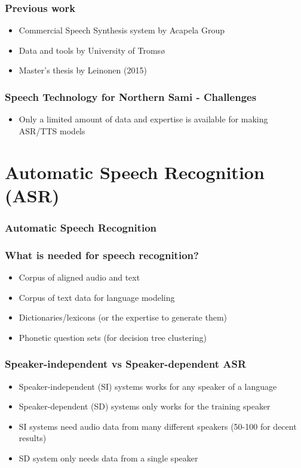 \begin{frame}
\frametitle{Previous work}
\begin{itemize}
\item Commercial Speech Synthesis system by Acapela Group\\
\item Data and tools by University of Tromsø\\[1cm]
\item Master's thesis by Leinonen (2015)\\
\end{itemize}
\end{frame}

\begin{frame}
\frametitle{Speech Technology for Northern Sami - Challenges}
\begin{itemize}
\item Only a limited amount of data and expertise is available for making ASR/TTS models
\end{itemize}
\end{frame}



\section[Speech Recognition]{Automatic Speech Recognition (ASR)}
\begin{frame}
\frametitle{Automatic Speech Recognition}


\end{frame}



\begin{frame}
\frametitle{What is needed for speech recognition?}
\begin{itemize}
\item Corpus of aligned audio and text
\item Corpus of text data for language modeling
\item Dictionaries/lexicons (or the expertise to generate them)
\item Phonetic question sets (for decision tree clustering)
\end{itemize}
\end{frame}



\begin{frame}
\frametitle{Speaker-independent vs Speaker-dependent ASR}
\begin{itemize}
\item Speaker-independent (SI) systems works for any speaker of a language
\item Speaker-dependent (SD) systems  only works for the training speaker
\item SI systems need audio data from many different speakers (50-100 for decent results)
\item SD system only needs data from a single speaker
\end{itemize}
\end{frame}



